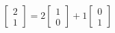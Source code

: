 \documentclass[preview]{standalone}
\begin{document}
\begin{align*}
\begin{bmatrix} 2 \\ 1 \end{bmatrix} =  2\begin{bmatrix} 1 \\ 0 \end{bmatrix} +  1\begin{bmatrix} 0 \\ 1 \end{bmatrix}
\end{align*}
\end{document}
